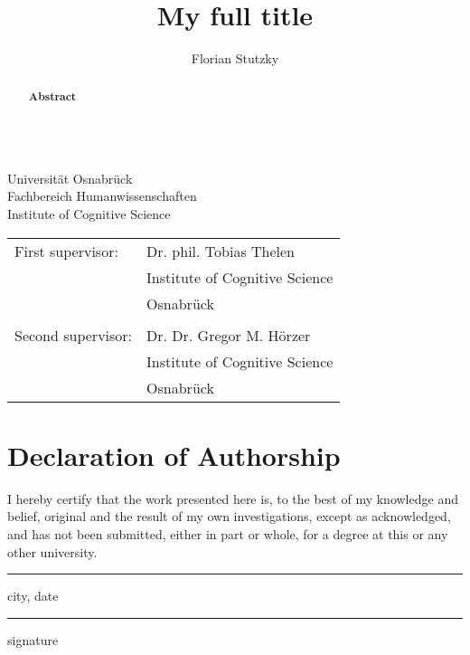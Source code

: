 \documentclass[11pt,
  paper=a4, 
  bibliography=totocnumbered,
	captions=tableheading,
	BCOR=10mm
]{scrreprt}
\title{My full title}
\author{Florian Stutzky}
\theoremstyle{definition}
\newcommand{\namesigdate}[1][5cm]{%
	\vspace{5cm}
	{\setlength{\parindent}{0cm}
	\begin{minipage}{0.3\textwidth}
		\hrule 
		\vspace{0.5cm}
		{\small city, date}
	\end{minipage}
	 \hfill
	\begin{minipage}{0.3\textwidth}
		\hrule
		\vspace{0.5cm}
	    {\small signature}
	\end{minipage}
	}
}
\begin{document}
\begin{titlepage}
	\begin{flushleft}
		Universität Osnabrück\\
		Fachbereich Humanwissenschaften\\
		Institute of Cognitive Science
	\end{flushleft}

	\vspace{2cm}
	\vspace{1cm}

	\begin{tabular}{ll}
		First supervisor:  & Dr. phil. Tobias Thelen        \\
		                   & Institute of Cognitive Science \\
		                   & Osnabrück                      \\\\
		Second supervisor: & Dr. Dr. Gregor M. Hörzer       \\
		                   & Institute of Cognitive Science \\
		                   & Osnabrück
	\end{tabular}

\end{titlepage}


\chapter*{Declaration of Authorship}
I hereby certify that the work presented here is, to the best of my knowledge and belief, original and the result of my own investigations, except as acknowledged, and has not been submitted, either in part or whole, for a degree at this or any other university.

\namesigdate
{}
\pagebreak

\begin{abstract}
	\textbf{\LARGE{Abstract}} \\\\
\end{abstract}
\end{document}
